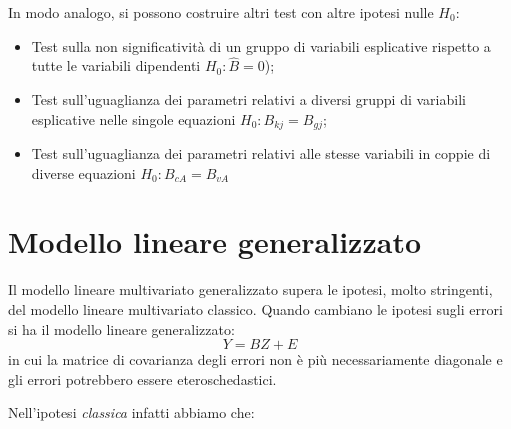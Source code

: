 \documentclass[a4page, 11pt]{article} %
\begin{document}
In modo analogo, si possono costruire altri test con altre ipotesi nulle $H_0$:
\begin{itemize}[noitemsep]
\item Test sulla non significatività di un gruppo di variabili esplicative rispetto a tutte le variabili dipendenti $H_0 : \hat{B} = 0$);
\item Test sull’uguaglianza dei parametri relativi a diversi gruppi di variabili esplicative nelle singole equazioni $H_0 : B_{kj} = B_{gj}$;
\item Test sull'uguaglianza dei parametri relativi alle stesse variabili in coppie di diverse equazioni $H_0 : B_{cA} = B_{vA}$
\end{itemize}


\section{Modello lineare generalizzato}
Il modello lineare multivariato generalizzato supera le ipotesi, molto stringenti, del modello lineare multivariato classico.
Quando cambiano le ipotesi sugli errori si ha il modello lineare generalizzato: $$Y = BZ+E$$ in cui la matrice di covarianza degli errori non è più necessariamente diagonale e gli errori potrebbero essere eteroschedastici. 

Nell’ipotesi \emph{classica} infatti abbiamo che:
\end{document}

